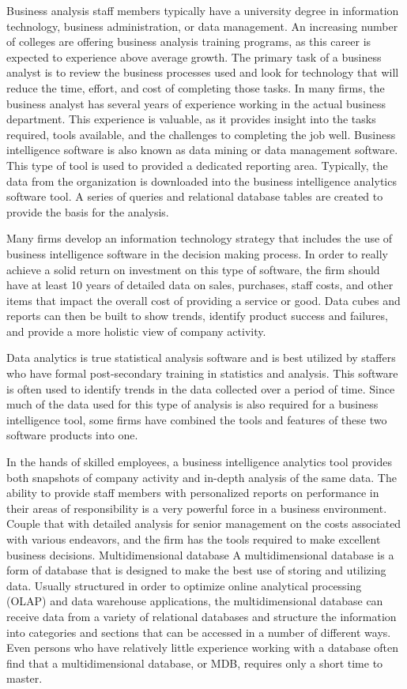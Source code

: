 Business analysis staff members typically have a university degree in information technology, business administration, or data management. An increasing number of colleges are offering business analysis training programs, as this career is expected to experience above average growth. The primary task of a business analyst is to review the business processes used and look for technology that will reduce the time, effort, and cost of completing those tasks. In many firms, the business analyst has several years of experience working in the actual business department. This experience is valuable, as it provides insight into the tasks required, tools available, and the challenges to completing the job well.
Business intelligence software is also known as data mining or data management software. This type of tool is used to provided a dedicated reporting area. Typically, the data from the organization is downloaded into the business intelligence analytics software tool. A series of queries and relational database tables are created to provide the basis for the analysis.
 
Many firms develop an information technology strategy that includes the use of business intelligence software in the decision making process. In order to really achieve a solid return on investment on this type of software, the firm should have at least 10 years of detailed data on sales, purchases, staff costs, and other items that impact the overall cost of providing a service or good. Data cubes and reports can then be built to show trends, identify product success and failures, and provide a more holistic view of company activity.
 
Data analytics is true statistical analysis software and is best utilized by staffers who have formal post-secondary training in statistics and analysis. This software is often used to identify trends in the data collected over a period of time. Since much of the data used for this type of analysis is also required for a business intelligence tool, some firms have combined the tools and features of these two software products into one.
 
In the hands of skilled employees, a business intelligence analytics tool provides both snapshots of company activity and in-depth analysis of the same data. The ability to provide staff members with personalized reports on performance in their areas of responsibility is a very powerful force in a business environment. Couple that with detailed analysis for senior management on the costs associated with various endeavors, and the firm has the tools required to make excellent business decisions.
Multidimensional database
A multidimensional database is a form of database that is designed to make the best use of storing and utilizing data. Usually structured in order to optimize online analytical processing (OLAP) and data warehouse applications, the multidimensional database can receive data from a variety of relational databases and structure the information into categories and sections that can be accessed in a number of different ways. Even persons who have relatively little experience working with a database often find that a multidimensional database, or MDB, requires only a short time to master.
 
